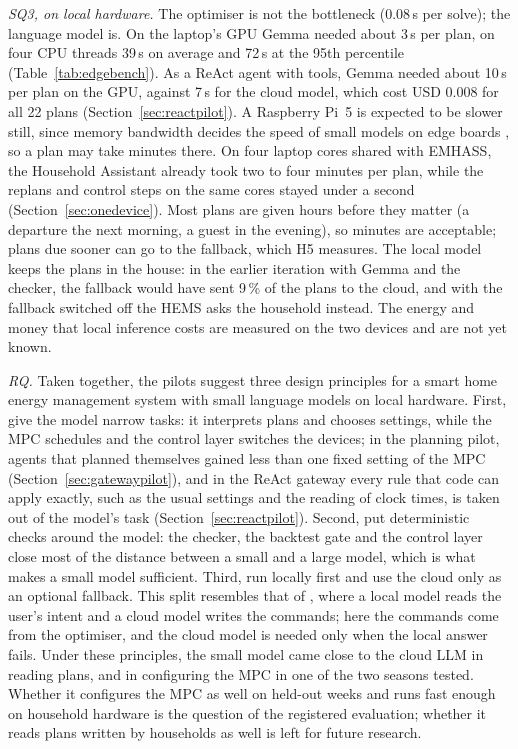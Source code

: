 \textit{SQ3, on local hardware.} The optimiser is not the bottleneck
(0.08\,s per solve); the language model is. On the laptop's GPU Gemma
needed about 3\,s per plan, on four CPU threads 39\,s on average and
72\,s at the 95th percentile (Table~\ref{tab:edgebench}). As a ReAct
agent with tools, Gemma needed about 10\,s per plan on the GPU, against
7\,s for the cloud model, which cost USD 0.008 for all 22 plans
(Section~\ref{sec:reactpilot}). A Raspberry
Pi~5 is expected to be slower still, since memory bandwidth decides the
speed of small models on edge boards \parencite{islam2025}, so a plan
may take minutes there. On four laptop cores shared with EMHASS, the
Household Assistant already took two to four minutes per plan, while
the replans and control steps on the same cores stayed under a second
(Section~\ref{sec:onedevice}). Most plans are given hours before they matter
(a departure the next morning, a guest in the evening), so minutes are
acceptable; plans due sooner can go to the fallback, which H5 measures.
The local model keeps the plans in the house: in the earlier iteration
with Gemma and the checker, the fallback would have sent 9\,\% of the
plans to the cloud,
and with the fallback switched off the HEMS asks the household instead.
The energy and money that local inference costs are measured on the two
devices and are not yet known.

\textit{RQ.} Taken together, the pilots suggest three design principles
for a smart home energy management system with small language models on
local hardware. First, give the model narrow tasks: it interprets plans
and chooses settings, while the MPC schedules and the control layer
switches the devices; in the planning pilot, agents that planned
themselves gained less than one fixed setting of the MPC
(Section~\ref{sec:gatewaypilot}), and in the ReAct gateway every rule
that code can apply exactly, such as the usual settings and the reading
of clock times, is taken out of the model's task
(Section~\ref{sec:reactpilot}). Second, put deterministic checks
around the model: the checker, the backtest gate and the control layer
close most of the distance between a small and a large model, which is
what makes a small model sufficient. Third, run locally first and use
the cloud only as an optional fallback. This split resembles that of
\textcite{dong2025}, where a local model reads the user's intent and a
cloud model writes the commands; here the commands come from the
optimiser, and the cloud model is needed only when the local answer
fails. Under these principles, the small model came close to the cloud
LLM in reading plans, and in configuring the MPC in one of the two
seasons tested. Whether it configures the MPC as well on held-out weeks
and runs fast enough on household hardware is the question of the
registered evaluation; whether it reads plans written by households as
well is left for future research.

